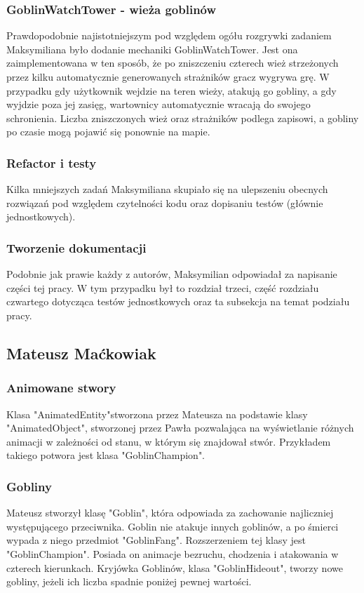 \documentclass{article}
\begin{document}
\subsubsection{GoblinWatchTower - wieża goblinów}
Prawdopodobnie najistotniejszym pod względem ogółu rozgrywki zadaniem Maksymiliana było dodanie mechaniki GoblinWatchTower. Jest ona zaimplementowana w ten sposób, że po zniszczeniu czterech wież strzeżonych przez kilku automatycznie generowanych strażników gracz wygrywa grę. W przypadku gdy użytkownik wejdzie na teren wieży, atakują go gobliny, a gdy wyjdzie poza jej zasięg, wartownicy automatycznie wracają do swojego schronienia. Liczba zniszczonych wież oraz strażników podlega zapisowi, a gobliny po czasie mogą pojawić się ponownie na mapie.

\subsubsection{Refactor i testy}
Kilka mniejszych zadań Maksymiliana skupiało się na ulepszeniu obecnych rozwiązań pod względem czytelności kodu oraz dopisaniu testów (głównie jednostkowych).

\subsubsection{Tworzenie dokumentacji}
Podobnie jak prawie każdy z autorów, Maksymilian odpowiadał za napisanie części tej pracy. W tym przypadku był to rozdział trzeci, część rozdziału czwartego dotycząca testów jednostkowych oraz ta subsekcja na temat podziału pracy.

\subsection{Mateusz Maćkowiak}
\subsubsection{Animowane stwory}
Klasa "AnimatedEntity"\space stworzona przez Mateusza na podstawie klasy "AnimatedObject", stworzonej przez Pawła pozwalająca na wyświetlanie różnych animacji w zależności od stanu, w którym się znajdował stwór. Przykładem takiego potwora jest klasa "GoblinChampion".

\subsubsection{Gobliny}
Mateusz stworzył klasę "Goblin", która odpowiada za zachowanie najliczniej występującego przeciwnika. Goblin nie atakuje innych goblinów, a po śmierci wypada z niego przedmiot "GoblinFang". Rozszerzeniem tej klasy jest "GoblinChampion". Posiada on animacje bezruchu, chodzenia i atakowania w czterech kierunkach. Kryjówka Goblinów, klasa "GoblinHideout", tworzy nowe gobliny, jeżeli ich liczba spadnie poniżej pewnej wartości.  
\end{document}

